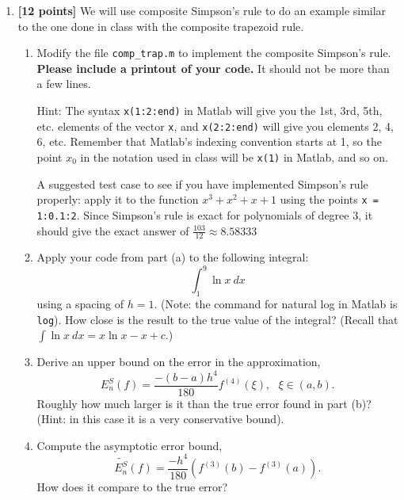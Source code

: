 \documentclass{article}
\begin{document}
\begin{enumerate}

\item {\bf [12 points]} We will use composite Simpson's rule to do an example similar to the one done in class with the composite trapezoid rule. 

\begin{enumerate} 
\itemsep1em
\item Modify the file {\tt comp\_trap.m} to implement the composite Simpson's rule. {\bf Please include a printout of your code.} It should not be more than a few lines.

Hint: The syntax {\tt x(1:2:end)} in Matlab will give you the 1st, 3rd, 5th, etc. elements of the vector {\tt x}, and {\tt x(2:2:end)} will give you elements 2, 4, 6, etc. Remember that Matlab's indexing convention starts at 1, so the point $x_0$ in the notation used in class will be {\tt x(1)} in Matlab, and so on.

A suggested test case to see if you have implemented Simpson's rule properly: apply it to the function $x^3 + x^2 + x + 1$ using the points {\tt x = 1:0.1:2}. Since Simpson's rule is exact for polynomials of degree 3, it should give the exact answer of $\frac{103}{12} \approx 8.58333$

\item Apply your code from part (a) to the following integral:
\begin{equation*}
\int_1^9 \ln x \: dx
\end{equation*}
using a spacing of $h = 1$. (Note: the command for natural log in Matlab is {\tt log}). How close is the result to the true value of the integral? (Recall that $\displaystyle \int \ln x \: dx = x \ln x - x + c$.)

\item Derive an upper bound on the error in the approximation,
\begin{equation*}
E^S_n (f) = \frac{-(b-a)h^4}{180} f^{(4)}(\xi), \: \: \: \xi \in (a,b).
\end{equation*}
Roughly how much larger is it than the true error found in part (b)? (Hint: in this case it is a very conservative bound).

\item Compute the asymptotic error bound,
\begin{equation*}
\widetilde{E^S_n}(f) = \frac{-h^4}{180} \left( f^{(3)}(b) - f^{(3)}(a) \right).
\end{equation*}
How does it compare to the true error?


\end{enumerate}
\end{enumerate}
\end{document}
